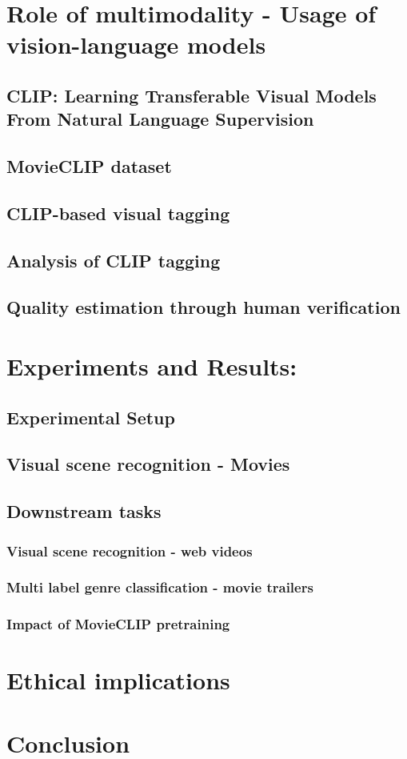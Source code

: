 \section{Role of multimodality - Usage of vision-language models}
\subsection{CLIP: Learning Transferable Visual Models From Natural Language Supervision}
\subsection{MovieCLIP dataset}
\subsection{CLIP-based visual tagging}
\subsection{Analysis of CLIP tagging}
\subsection{Quality estimation through human verification}
\section{Experiments and Results:}
\subsection{Experimental Setup}
\subsection{Visual scene recognition - Movies}
\subsection{Downstream tasks}
\subsubsection{Visual scene recognition - web videos}
\subsubsection{Multi label genre classification - movie trailers}
\subsubsection{Impact of MovieCLIP pretraining}
\section{Ethical implications}
\section{Conclusion}
